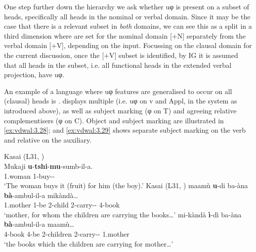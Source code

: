 \documentclass[output=paper]{langsci/langscibook}
\begin{document}
One step further down the hierarchy we ask whether uφ is present on a subset of
heads, specifically all heads in the nominal or verbal domain. Since it may be
the case that there is a relevant subset in \emph{both} domains, we can see
this as a split in a third dimension where  are set for the nominal
domain [$+$N] separately from the verbal domain [$+$V], depending on the input.
Focussing on the clausal domain for the current discussion, once the [$+$V]
subset is identified, by \gls{IG} it is assumed that all heads in the subset, i.e.
all functional heads in the extended verbal projection, have uφ.

An example of a language where uφ features are generalised to occur on all
(clausal) heads is .  displays multiple  (i.e. uφ on
v and Appl, in the system as introduced above), as well as subject marking (φ
on T) and agreeing relative complementisers (φ on C). Object and
subject marking are illustrated in \eqref{ex:vdwal:3.28}; and \eqref{ex:vdwal:3.29} shows
separate subject marking on the verb and relative  on the
auxiliary.

\ea\label{ex:vdwal:3.28}  Kasai (L31, \citealt[87]{Cocchi2000})\label{bkm:Ref345186241}\\
    \gll Mukaji  \textbf{u}{}-\textbf{tshi}{}-\textbf{mu}{}-sumb-il-a.\\
          1.woman  1\Om{}-buy-\Appl{}{}-\Fv{}\\
    \glt      `The woman buys it (fruit) for him (the boy).’
\ex\label{ex:vdwal:3.29}  Kasai (L31, \citealt[104]{deKindBostoen2012}) \label{bkm:Ref345186270}
	\ea
	\gll	 maamù  \textbf{u}{}-di  ba-àna  \textbf{bà}{}-ambul-il-a  mikàndà…\\
	    1.mother  1\Rm{}-be  2-child  2\Sm{}-carry-\Appl{}{}-\Fv{}  4-book\\
	\glt    ‘mother, for whom the children are carrying the books…’
	\ex
	\gll	 mi-kàndà  \textbf{ì}{}-dì  ba-àna  \textbf{bà}{}-ambul-il-a  maamù…\\
	    4-book  4\Rm{}-be  2-children  2\Sm{}-carry-\Appl{}{}-\Fv{}  1.mother\\
	\glt    ‘the books which the children are carrying for mother…’
	\z
\z
\end{document}
